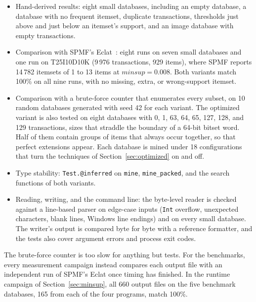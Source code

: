 \begin{itemize}
\item Hand-derived results: eight small databases, including an empty database, a
database with no frequent itemset, duplicate transactions, thresholds just above and
just below an itemset's support, and an image database with empty transactions.
\item Comparison with SPMF's Eclat~\cite{spmf2016}: eight runs on seven small databases
and one run on T25I10D10K (9\,976 transactions, 929 items), where SPMF reports 14\,782
itemsets of 1 to 13 items at $\mathit{minsup} = 0.008$. Both variants match 100\% on all
nine runs, with no missing, extra, or wrong-support itemset.
\item Comparison with a brute-force counter that enumerates every subset, on 10 random
databases generated with seed 42 for each variant. The optimized variant is also tested
on eight databases with 0, 1, 63, 64, 65, 127, 128, and 129 transactions, sizes that
straddle the boundary of a 64-bit bitset word. Half of them contain groups of items that
always occur together, so that perfect extensions appear. Each database is mined under 18
configurations that turn the techniques of Section~\ref{sec:optimized} on and off.
\item Type stability: \texttt{Test.@inferred} on \texttt{mine}, \texttt{mine\_packed},
and the search functions of both variants.
\item Reading, writing, and the command line: the byte-level reader is checked against a
line-based parser on edge-case inputs (\texttt{Int} overflow, unexpected characters,
blank lines, Windows line endings) and on every small database. The writer's output is
compared byte for byte with a reference formatter, and the tests also cover argument
errors and process exit codes.
\end{itemize}

The brute-force counter is too slow for anything but tests. For the benchmarks, every
measurement campaign instead compares each output file with an independent run of SPMF's
Eclat once timing has finished. In the runtime campaign of Section~\ref{sec:minsup}, all
660 output files on the five benchmark databases, 165 from each of the four programs,
match 100\%.

